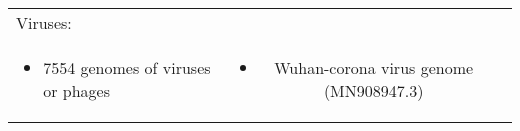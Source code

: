 {\begin{minipage}[t]{786mm}
\begin{center}
\begin{tabular}{lcl}
\hspace{-5mm} Viruses: &  & \\
 \hspace{-5mm}\begin{minipage}{240mm} \begin{itemize} \item 7554 genomes of viruses or phages \end{itemize}\end{minipage}& \begin{minipage}{240mm} \begin{itemize} \item Wuhan-corona virus genome (MN908947.3) \end{itemize}\end{minipage}& \\
\end{tabular}\end{center}
\vspace{5mm}
\end{minipage} }
